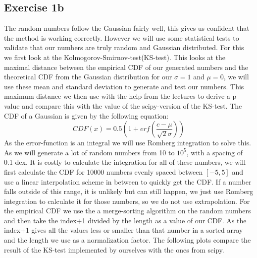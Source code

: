   \subsection{Exercise 1b}
  The random numbers follow the Gaussian fairly well, this gives us confident that the method is working correctly. However we will use some statistical tests to validate that our numbers are truly random and Gaussian distributed. For this we first look at the Kolmogorov-Smirnov-test(KS-test).
  This looks at the maximal distance between the empirical CDF of our generated numbers and the theoretical CDF from the Gaussian distribution for our $\sigma=1$ and $\mu=0$, we will use these mean and standard deviation to generate and test our numbers. This maximum distance we then use with the help from the lectures to derive a p-value and compare this with the value of the scipy-version of the KS-test. The CDF of a Gaussian is given by the following equation:
  \begin{equation}
      CDF(x)=0.5\left(1+erf(\frac{c-\mu}{\sqrt{2}\sigma})\right)
  \end{equation}
  As the error-function is an integral we will use Romberg integration to solve this. As we will generate a lot of random numbers from 10 to $10^5$, with a spacing of 0.1 dex. It is costly to calculate the integration for all of these numbers, we will first calculate the CDF for 10000 numbers evenly spaced between $[-5,5]$ and use a linear interpolation scheme in between to quickly get the CDF. If a number falls outside of this range, it is unlikely but can still happen, we just use Romberg integration to calculate it for those numbers, so we do not use extrapolation. For the empirical CDF we use the a merge-sorting algorithm on the random numbers and then take the index+1 divided by the length as a value of our CDF. As the index+1 gives all the values less or smaller than that number in a sorted array and the length we use as a normalization factor.
 The following plots compare the result of the KS-test implemented by ourselves with the ones from scipy.  
 
 
 
